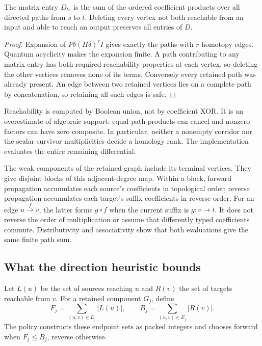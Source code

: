\begin{proposition}
The matrix entry $D_{ts}$ is the sum of the ordered coefficient products
over all directed paths from $s$ to $t$.  Deleting every vertex not both
reachable from an input and able to reach an output preserves all entries
of $D$.
\end{proposition}
\begin{proof}
Expansion of $P\delta(H\delta)^r I$ gives exactly the paths with $r$
homotopy edges.  Quantum acyclicity makes the expansion finite.  A path
contributing to any matrix entry has both required reachability properties
at each vertex, so deleting the other vertices removes none of its terms.
Conversely every retained path was already present.  An edge between two
retained vertices lies on a complete path by concatenation, so retaining
all such edges is safe.
\end{proof}

Reachability is computed by Boolean union, not by coefficient XOR.  It is
an overestimate of algebraic support: equal path products can cancel and
nonzero factors can have zero composite.  In particular, neither a nonempty
corridor nor the scalar survivor multiplicities decide a homology rank.
The implementation evaluates the entire remaining differential.

The weak components of the retained graph include its terminal vertices.
They give disjoint blocks of this adjacent-degree map.  Within a block,
forward propagation accumulates each source's coefficients in topological
order; reverse propagation accumulates each target's suffix coefficients
in reverse order.  For an edge $u\xrightarrow{f}v$, the latter forms
$g\circ f$ when the current suffix is $g:v\to t$.  It does not reverse
the order of multiplication or assume that differently typed coefficients
commute.  Distributivity and associativity show that both evaluations
give the same finite path sum.

\subsection{What the direction heuristic bounds}

Let $L(u)$ be the set of sources reaching $u$ and $R(v)$ the set of
targets reachable from $v$.  For a retained component $G_j$, define
\[
 F_j=\sum_{(u,v)\in E_j}|L(u)|,\qquad
 B_j=\sum_{(u,v)\in E_j}|R(v)|.
\]
The  policy constructs these endpoint sets as packed integers
and chooses forward when $F_j\le B_j$, reverse otherwise.

